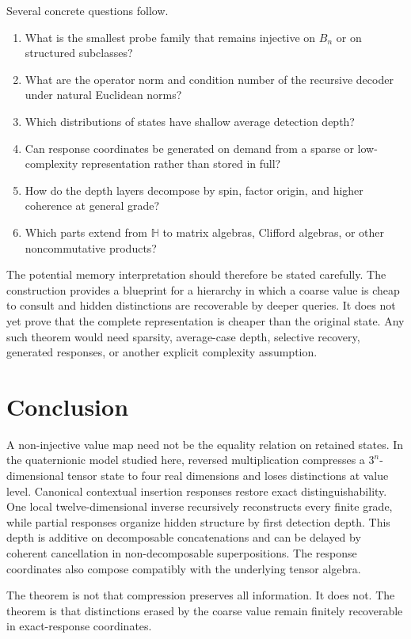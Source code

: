 \documentclass[11pt]{article}
\theoremstyle{definition}
\theoremstyle{remark}
\newcommand{\Hq}{\mathbb H}
\begin{document}
Several concrete questions follow.
\begin{enumerate}
  \item What is the smallest probe family that remains injective on $B_n$ or on structured subclasses?
  \item What are the operator norm and condition number of the recursive decoder under natural Euclidean norms?
  \item Which distributions of states have shallow average detection depth?
  \item Can response coordinates be generated on demand from a sparse or low-complexity representation rather than stored in full?
  \item How do the depth layers decompose by spin, factor origin, and higher coherence at general grade?
  \item Which parts extend from $\Hq$ to matrix algebras, Clifford algebras, or other noncommutative products?
\end{enumerate}

The potential memory interpretation should therefore be stated carefully.  The construction provides a blueprint for a hierarchy in which a coarse value is cheap to consult and hidden distinctions are recoverable by deeper queries.  It does not yet prove that the complete representation is cheaper than the original state.  Any such theorem would need sparsity, average-case depth, selective recovery, generated responses, or another explicit complexity assumption.

\section{Conclusion}

A non-injective value map need not be the equality relation on retained states.  In the quaternionic model studied here, reversed multiplication compresses a $3^n$-dimensional tensor state to four real dimensions and loses distinctions at value level.  Canonical contextual insertion responses restore exact distinguishability.  One local twelve-dimensional inverse recursively reconstructs every finite grade, while partial responses organize hidden structure by first detection depth.  This depth is additive on decomposable concatenations and can be delayed by coherent cancellation in non-decomposable superpositions.  The response coordinates also compose compatibly with the underlying tensor algebra.

The theorem is not that compression preserves all information.  It does not.  The theorem is that distinctions erased by the coarse value remain finitely recoverable in exact-response coordinates.
\end{document}
